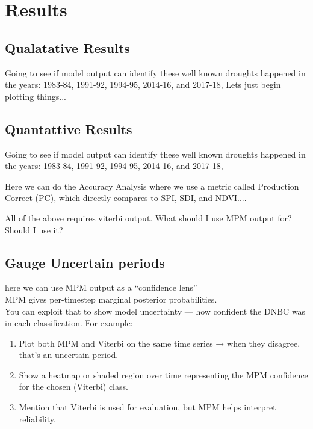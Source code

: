 \graphicspath{{results/fig/}}

\chapter{Results}
\label{chap:results}


\section{Qualatative Results}
Going to see if model output can identify these well known droughts happened in the years: 1983-84, 1991-92, 1994-95, 2014-16, and 2017-18,
Lets just begin plotting things...

\section{Quantattive Results}
Going to see if model output can identify these well known droughts happened in the years: 1983-84, 1991-92, 1994-95, 2014-16, and 2017-18,

Here we can do the Accuracy Analysis where we use a metric called Production Correct (PC), which directly compares to SPI, SDI, and NDVI....

All of the above requires viterbi output. What should I use MPM output for? Should I use it?


\section{Gauge Uncertain periods}

here we can use MPM output as a “confidence lens” \\
MPM gives per-timestep marginal posterior probabilities. \\
You can exploit that to show model uncertainty — how confident the DNBC was in each classification.
For example:

\begin{enumerate}
    \item Plot both MPM and Viterbi on the same time series → when they disagree, that’s an uncertain period.
    \item Show a heatmap or shaded region over time representing the MPM confidence for the chosen (Viterbi) class.
    \item Mention that Viterbi is used for evaluation, but MPM helps interpret reliability.
\end{enumerate}








